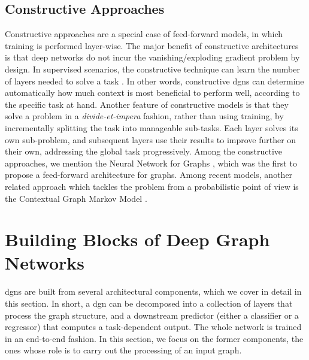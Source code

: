 \subsection{Constructive Approaches}
Constructive approaches are a special case of feed-forward models, in which training is performed layer-wise. The major benefit of constructive architectures is that deep networks do not incur the vanishing/exploding gradient problem by design. In supervised scenarios, the constructive technique can learn the number of layers needed to solve a task \citep{fahlman1990cascor,marquez2018deepcascade,bianucci2000cascorchemistry}. In other words, constructive \glspl{dgn} can determine automatically how much context is most beneficial to perform well, according to the specific task at hand. Another feature of constructive models is that they solve a problem in a \emph{divide-et-impera} fashion, rather than using  training, by incrementally splitting the task into manageable sub-tasks. Each layer solves its own sub-problem, and subsequent layers use their results to improve further on their own, addressing the global task progressively. Among the constructive approaches, we mention the Neural Network for Graphs \citep{micheli2009nn4g}, which was the first to propose a feed-forward architecture for graphs. Among recent models, another related approach which tackles the problem from a probabilistic point of view is the Contextual Graph Markov Model \citep{bacciu2018contgraphmarkov}.

\section{Building Blocks of Deep Graph Networks}
\glspl{dgn} are built from several architectural components, which we cover in detail in this section. In short, a \gls{dgn} can be decomposed into a collection of layers that process the graph structure, and a downstream predictor (either a classifier or a regressor) that computes a task-dependent output. The whole network is trained in an end-to-end fashion. In this section, we focus on the former components, the ones whose role is to carry out the processing of an input graph.

